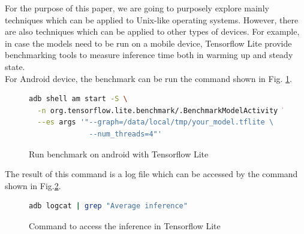 For the purpose of this paper, we are going to purposely explore mainly techniques which can be applied to Unix-like operating systems. However, there are also techniques which can be applied to other types of devices. For example, in case the models need to be run on a mobile device, Tensorflow Lite provide benchmarking tools to measure inference time both in warming up and steady state. \cite{tensorflow2015-whitepaper}\\ 
For Android device, the benchmark can be run the command shown in Fig. \ref{fig:bench_ten_lite_an}.\\
\begin{figure}[h]
\begin{lstlisting}[language=bash]
adb shell am start -S \
  -n org.tensorflow.lite.benchmark/.BenchmarkModelActivity \
  --es args '"--graph=/data/local/tmp/your_model.tflite \
              --num_threads=4"'
\end{lstlisting}
\caption[Run benchmark on android with Tensorflow Lite]{Run benchmark on android with Tensorflow Lite \cite{tensorflow2015-whitepaper}}
\label{fig:bench_ten_lite_an}
\end{figure}
The result of this command is a log file which can be accessed by the command shown in Fig.\ref{fig:inf_ten}.\\
\begin{figure}[h]
\begin{lstlisting}[language=bash]
adb logcat | grep "Average inference"
\end{lstlisting}
\caption[Command to access the inference in Tensorflow Lite]{Command to access the inference in Tensorflow Lite\cite{tensorflow2015-whitepaper}}
\label{fig:inf_ten}
\end{figure}



